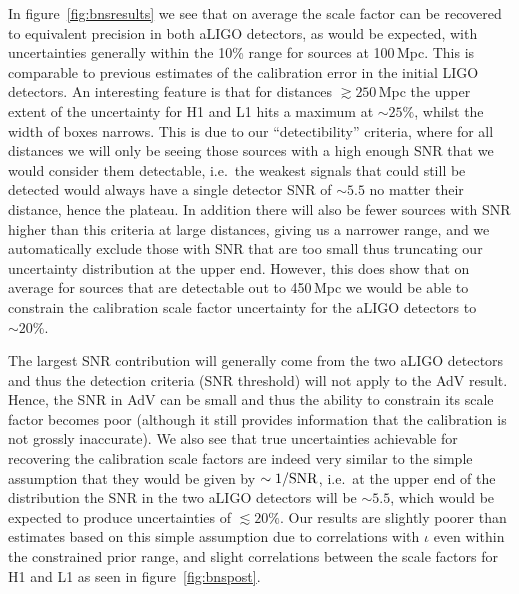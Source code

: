\documentclass[prd, twocolumn, lengthcheck, superscriptaddress, showpacs, letterpaper, nofootinbib]{revtex4-1}
\begin{document}
In figure~\ref{fig:bnsresults} we see that on average the scale factor can be
recovered to equivalent precision in both \ac{aLIGO} detectors, as would be
expected, with uncertainties generally within the 10\% range for sources at
100\,Mpc. This is comparable to previous estimates of the calibration error in
the initial LIGO detectors. An interesting feature is that for distances
$\gtrsim 250$\,Mpc the upper extent of the uncertainty for H1 and L1 hits a
maximum at $\sim 25\%$, whilst the width of boxes narrows. This is due to our
``detectibility'' criteria, where for all distances we will only be seeing
those sources with a high enough \ac{SNR} that we would consider them
detectable, i.e.\ the weakest signals that could still be detected would
always have a single detector \ac{SNR} of $\sim 5.5$ no matter their distance, hence the
plateau. In addition there will also be fewer sources with \ac{SNR} higher than
this criteria at large distances, giving us a narrower range, and we
automatically exclude those with \ac{SNR} that are too small thus truncating
our uncertainty distribution at the upper end.  However, this does show that on
average for sources that are detectable out to 450\,Mpc we would be able to
constrain the calibration scale factor uncertainty for the \ac{aLIGO} detectors
to $\sim 20\%$. 

The largest \ac{SNR} contribution will generally come from the two
\ac{aLIGO} detectors and thus the detection criteria (\ac{SNR} threshold) will
not apply to the \ac{AdV} result. Hence, the \ac{SNR} in \ac{AdV} can be small
and thus the ability to constrain its scale factor becomes poor (although it
still provides information that the calibration is not grossly inaccurate). We
also see that true uncertainties achievable for recovering the calibration
scale factors are indeed very similar to the simple assumption that they would
be given by $\sim 1/{\rm SNR}$, i.e.\ at the upper end of the distribution the
\ac{SNR} in the two \ac{aLIGO} detectors will be $\sim 5.5$, which would be
expected to produce uncertainties of $\lesssim 20\%$. Our results are slightly
poorer than estimates based on this simple assumption due to correlations with
$\iota$ even within the constrained prior range, and slight correlations
between the scale factors for H1 and L1 as seen in figure~\ref{fig:bnspost}.
\end{document}
